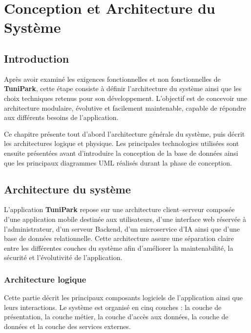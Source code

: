 \chapter{Conception et Architecture du Système}
\label{chap:system_design_architecture}

\section{Introduction}

\par Après avoir examiné les exigences fonctionnelles et non fonctionnelles de \textbf{TuniPark}, cette étape consiste à définir l'architecture du système ainsi que les choix techniques retenus pour son développement. L'objectif est de concevoir une architecture modulaire, évolutive et facilement maintenable, capable de répondre aux différents besoins de l'application.

\par Ce chapitre présente tout d'abord l'architecture générale du système, puis décrit les architectures logique et physique. Les principales technologies utilisées sont ensuite présentées avant d'introduire la conception de la base de données ainsi que les principaux diagrammes UML réalisés durant la phase de conception.
\section{Architecture du système}

\par L'application \textbf{TuniPark} repose sur une architecture client--serveur composée d'une application mobile destinée aux utilisateurs, d'une interface web réservée à l'administrateur, d'un serveur Backend, d'un microservice d'IA ainsi que d'une base de données relationnelle. Cette architecture assure une séparation claire entre les différentes couches du système afin d'améliorer la maintenabilité, la sécurité et l'évolutivité de l'application.

    \subsection{Architecture logique}

    \par Cette partie décrit les principaux composants logiciels de l'application ainsi que leurs interactions. Le système est organisé en cinq couches : la couche de présentation, la couche métier, la couche d'accès aux données, la couche de données et la couche des services externes.

